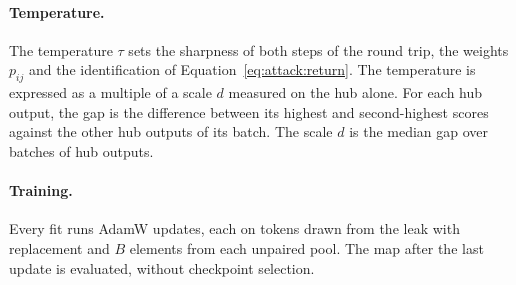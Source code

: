 \paragraph{Temperature.} The temperature $\tau$ sets the sharpness of both steps of the round trip, the weights $p_{ij}$ and the identification of Equation~\ref{eq:attack:return}.
The temperature is expressed as a multiple of a scale $d$ measured on the hub alone.
For each hub output, the gap is the difference between its highest and second-highest scores against the other hub outputs of its batch.
The scale $d$ is the median gap over  batches of  hub outputs.

\paragraph{Training.} Every fit runs  AdamW updates, each on  tokens drawn from the leak with replacement and $B$ elements from each unpaired pool.
The map after the last update is evaluated, without checkpoint selection.
